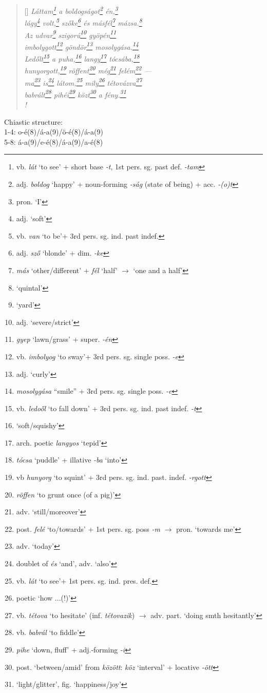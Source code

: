 \documentclass[a4paper,12pt,twoside,final]{book}
\begin{document}
\begin{verse}[\versewidth]
  \it
  Láttam\footnote{vb. \emph{lát} `to see' +
  short base \emph{-t}, 1st pers. sg. past def. \emph{-tam}} a
  boldogságot\footnote{adj. \emph{boldog} `happy' + noun-forming
  \emph{-ság} (state of being) + acc. \emph{-(o)t}}
  én,\footnote{pron. `I'} \\
  lágy\footnote{adj. `soft'} volt,\footnote{vb. \emph{van} `to
  be'+ 3rd pers. sg. ind. past indef.} szőke\footnote{adj. \emph{sző}
  `blonde' + dim. \emph{-ke}} és másfél\footnote{\emph{más}
  `other/different' + \emph{fél} `half' $\rightarrow$ `one and a
  half'} mázsa.\footnote{`quintal'} \\
  Az udvar\footnote{`yard'} szigorú\footnote{adj. `severe/strict'}
  gyöpén\footnote{\emph{gyep} `lawn/grass' + super. \emph{-én}}  \\
  imbolygott\footnote{vb. \emph{imbolyog} `to sway'+ 3rd
  pers. sg. single poss. \emph{-e}} göndör\footnote{adj. `curly'}
  mosolygása.\footnote{\emph{mosolygása} ``smile'' + 3rd
  pers. sg. single poss. \emph{-e}} \\
  Ledőlt\footnote{vb. \emph{ledoől} `to fall down' + 3rd
  pers. sg. ind. past indef. \emph{-t}} a puha,\footnote{`soft/squishy'}
  langy\footnote{arch. poetic \emph{langyos} `tepid'}
  tócsába,\footnote{\emph{tócsa} `puddle' + illative \emph{-ba}
  `into'} \\
  hunyorgott,\footnote{vb \emph{hunyorg} `to squint' + 3rd
  pers. sg. ind. past. indef. \emph{-rgott}}
  röffent\footnote{\emph{röffen} `to grunt once (of a pig)'}
  még\footnote{adv. `still/moreover'} felém\footnote{post. \emph{felé}
  `to/towards' + 1st pers. sg. poss \emph{-m} $\rightarrow$
  pron. `towards me'} --- \\
  ma\footnote{adv. `today'} is\footnote{doublet of \emph{és} `and',
  adv. `also'} látom,\footnote{vb. \emph{lát} `to see'+ 1st
  pers. sg. ind. pres. def.} mily\footnote{poetic `how ...(!)'}
  tétovázva\footnote{vb. \emph{tétova} `to hesitate'
  (inf. \emph{tétovazik}) $\rightarrow$ adv. part. `doing smth
  hesitantly'} \\
  babrált\footnote{vb. \emph{babrál} `to fiddle'}
  pihéi\footnote{\emph{pihe} `down, fluff' + adj.-forming \emph{-i}}
  közt\footnote{post. `between/amid' from \emph{között}: \emph{köz}
  `interval' + locative \emph{-ött}} a fény.\footnote{`light/glitter',
  fig. `happiness/joy'} \\!
\end{verse}

\noindent Chiastic structure: \\
1-4: o-é(8)/á-a(9)/ö-é(8)/á-a(9) \\
5-8: á-a(9)/e-é(8)/á-a(9)/a-é(8)
\end{document}
